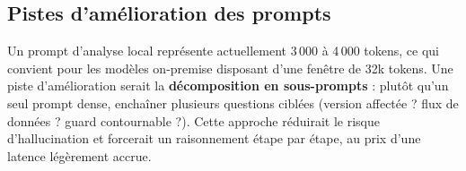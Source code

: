 \documentclass[a4paper, 12pt, hidelinks]{article}
\begin{document}
\subsection*{Pistes d'amélioration des prompts}

Un prompt d'analyse local représente actuellement 3\,000 à 4\,000 tokens, ce qui convient pour les modèles on-premise disposant d'une fenêtre de 32k tokens. Une piste d'amélioration serait la \textbf{décomposition en sous-prompts} : plutôt qu'un seul prompt dense, enchaîner plusieurs questions ciblées (version affectée ? flux de données ? guard contournable ?). Cette approche réduirait le risque d'hallucination et forcerait un raisonnement étape par étape, au prix d'une latence légèrement accrue.
\end{document}
